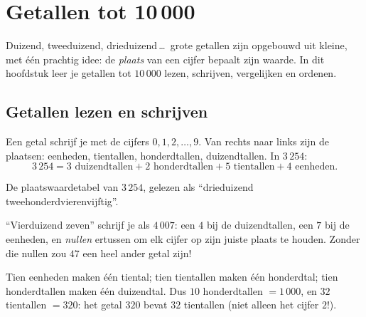 \chapter{Getallen tot 10\,000}\label{ch:g3:numbers}

Duizend, tweeduizend, drieduizend\,\dots\ grote getallen zijn opgebouwd
uit kleine, met één prachtig idee: de \emph{plaats} van een cijfer
bepaalt zijn waarde. In dit hoofdstuk leer je getallen tot $10\,000$
lezen, schrijven, vergelijken en ordenen.

\section{Getallen lezen en schrijven}

\begin{definition}[Plaatswaarde]\label{def:g3:numbers:place}
Een getal schrijf je met de cijfers $0, 1, 2, \dots, 9$. Van rechts naar
links zijn de plaatsen: eenheden, tientallen, honderdtallen,
duizendtallen. In $3\,254$:
\[
3\,254 = 3 \text{ duizendtallen} + 2 \text{ honderdtallen}
+ 5 \text{ tientallen} + 4 \text{ eenheden}.
\]
\end{definition}

\begin{omfigure}

{\small De plaatswaardetabel van $3\,254$, gelezen als
``drieduizend tweehonderdvierenvijftig''.}
\end{omfigure}

\begin{example}\label{ex:g3:numbers:zero}
``Vierduizend zeven'' schrijf je als $4\,007$: een $4$ bij de
duizendtallen, een $7$ bij de eenheden, en \emph{nullen} ertussen om elk
cijfer op zijn juiste plaats te houden. Zonder die nullen zou $47$ een
heel ander getal zijn!
\end{example}

\begin{example}[Wisselen]\label{ex:g3:numbers:exchange}
Tien eenheden maken één tiental; tien tientallen maken één honderdtal;
tien honderdtallen maken één duizendtal. Dus $10$ honderdtallen
$= 1\,000$, en $32$ tientallen $= 320$: het getal $320$ bevat $32$
tientallen (niet alleen het cijfer $2$!).
\end{example}

